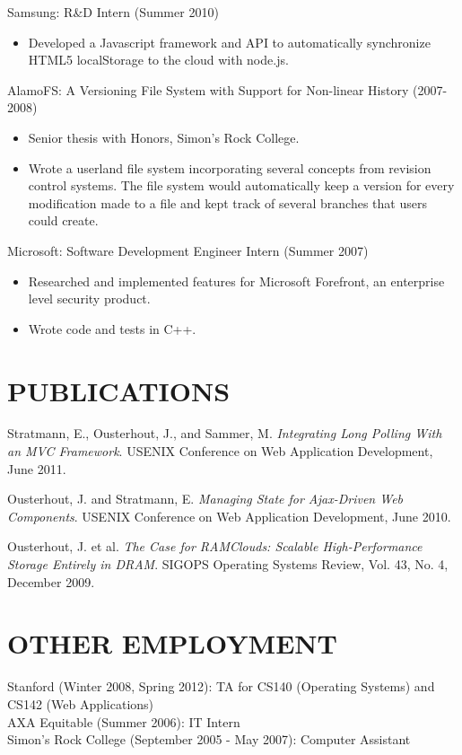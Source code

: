 \documentclass{res}
\begin{document}
\begin{resume}
Samsung: R\&D Intern (Summer 2010)
\begin{itemize}
    \item Developed a Javascript framework and API to automatically synchronize HTML5 localStorage to the cloud with node.js.
\end{itemize}

AlamoFS: A Versioning File System with Support for Non-linear History (2007-2008)
\begin{itemize}
    \item Senior thesis with Honors, Simon's Rock College.
    \item Wrote a userland file system incorporating several concepts from revision control systems. The file system would automatically keep a version for every modification made to a file and kept track of several branches that users could create.
\end{itemize}

Microsoft: Software Development Engineer Intern (Summer 2007)
\begin{itemize}
    \item Researched and implemented features for Microsoft Forefront, an enterprise level security product.
    \item Wrote code and tests in C++.
\end{itemize}

\section{PUBLICATIONS}          

Stratmann, E., Ousterhout, J., and Sammer, M. \emph{Integrating Long Polling With an MVC Framework}. USENIX Conference on Web Application Development, June 2011.

Ousterhout, J. and Stratmann, E. \emph{Managing State for Ajax-Driven Web Components}. USENIX \mbox{Conference} on Web Application Development, June 2010.

Ousterhout, J. et al. \emph{The Case for RAMClouds: Scalable High-Performance Storage Entirely in DRAM}. SIGOPS Operating Systems Review, Vol. 43, No. 4, December 2009.

\section{OTHER EMPLOYMENT}
Stanford (Winter 2008, Spring 2012): TA for CS140 (Operating Systems) and CS142 (Web Applications) \\
AXA Equitable (Summer 2006): IT Intern \\
Simon's Rock College (September 2005 - May 2007): Computer Assistant
\end{resume}
\end{document}
